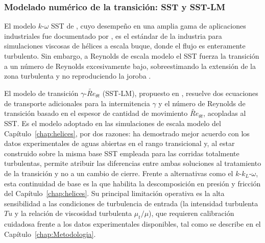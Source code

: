 \subsubsection*{Modelado numérico de la transición: SST y SST-LM}
\label{sec:modelos_transicion}
 
El modelo $k$-$\omega$ SST de \citet{Menter1994}, cuyo desempeño en una amplia gama de aplicaciones industriales fue documentado por \citet{menter2003}, es el estándar de la industria para simulaciones viscosas de hélices a escala buque, donde el flujo es enteramente turbulento. Sin embargo, a Reynolds de escala modelo el SST fuerza la transición a un número de Reynolds excesivamente bajo, sobreestimando la extensión de la zona turbulenta y no reproduciendo la joroba \citep{baltazar2018transition}.
 
El modelo de transición $\gamma$-$\widetilde{Re}_{\theta t}$ (SST-LM), propuesto en \citet{langtry2009}, resuelve dos ecuaciones de transporte adicionales para la intermitencia $\gamma$ y el número de Reynolds de transición basado en el espesor de cantidad de movimiento $\widetilde{Re}_{\theta t}$, acopladas al SST. Es el modelo adoptado en las simulaciones de escala modelo del Capítulo~\ref{chap:helices}, por dos razones: ha demostrado mejor acuerdo con los datos experimentales de aguas abiertas en el rango transicional \citep{baltazar2018transition} y, al estar construido sobre la misma base SST empleada para las corridas totalmente turbulentas, permite atribuir las diferencias entre ambas soluciones al tratamiento de la transición y no a un cambio de cierre. Frente a alternativas como el $k$-$k_L$-$\omega$, esta continuidad de base es la que habilita la descomposición en presión y fricción del Capítulo~\ref{chap:helices}. Su principal limitación operativa es la alta sensibilidad a las condiciones de turbulencia de entrada (la intensidad turbulenta $Tu$ y la relación de viscosidad turbulenta $\mu_t/\mu$), que requieren calibración cuidadosa frente a los datos experimentales disponibles, tal como se describe en el Capítulo~\ref{chap:Metodologia}.